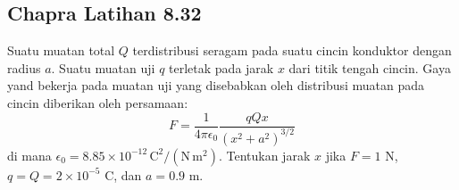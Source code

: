 \subsection{Chapra Latihan 8.32}

Suatu muatan total $Q$ terdistribusi seragam pada suatu cincin konduktor
dengan radius $a$. Suatu muatan uji $q$ terletak pada jarak $x$
dari titik tengah cincin. Gaya yand bekerja pada muatan uji yang disebabkan
oleh distribusi muatan pada cincin diberikan oleh persamaan:
\begin{equation*}
F = \frac{1}{4\pi\epsilon_{0}}\frac{qQx}{\left( x^2 + a^2 \right)^{3/2}}
\end{equation*}
di mana $\epsilon_{0} = 8.85\times 10^{-12}\,\mathrm{C}^2/(\mathrm{N}\,\mathrm{m}^{2})$.
Tentukan jarak $x$ jika $F = 1$ N, $q = Q = 2\times 10^{-5}$ C, dan $a = 0.9$ m.